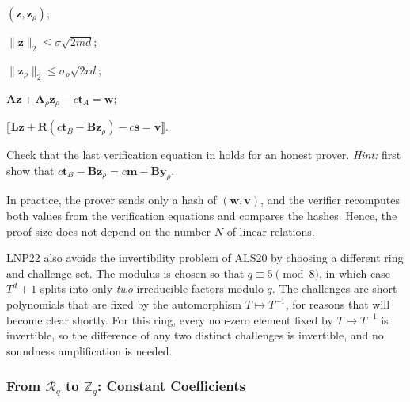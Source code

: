 \documentclass[../../book.tex]{subfiles}
\begin{document}
\begin{algoproto}[H]
\begin{mdframed}[linecolor=black, linewidth=1pt,
                     skipabove=10pt, skipbelow=10pt,
                     innerleftmargin=5pt, innerrightmargin=5pt]
\begin{minipage}[t]{0.5\linewidth}
\begin{algoen}
                \item {} $(\mathbf{z}, \mathbf{z}_{\rho})$;
                \item {} $\|\mathbf{z}\|_2 \leq \sigma\sqrt{2md}$;
                \item {} $\|\mathbf{z}_{\rho}\|_2 \leq \sigma_{\rho}\sqrt{2rd}$;
                \item {} $\mathbf{A}\mathbf{z} + \mathbf{A}_{\rho}\mathbf{z}_{\rho} - c\mathbf{t}_A = \mathbf{w}$;
                \item {} $\llbracket \mathbf{L}\mathbf{z} + \mathbf{R}(c\mathbf{t}_B - \mathbf{B}\mathbf{z}_{\rho}) - c\mathbf{s} = \mathbf{v} \rrbracket$.
            \end{algoen}
        \end{minipage}
    \end{mdframed}
    \caption{Opening proof for the ABDLOP commitment $\mathsf{T}$ together with $N$ public $\mathcal{R}_q$-linear relations $\mathbf{L}\mathbf{x} + \mathbf{R}\mathbf{m} = \mathbf{s}$ (following \cite[Fig.~4]{C:LyuNguPla22}).}
    \label{fig:lnp22-linear}
\end{algoproto}

\begin{exercise}
    Check that the last verification equation in  holds for an honest prover.
    \textit{Hint:} first show that $c\mathbf{t}_B - \mathbf{B}\mathbf{z}_{\rho} = c\mathbf{m} - \mathbf{B}\mathbf{y}_{\rho}$.
\end{exercise}

In practice, the prover sends only a hash of $(\mathbf{w}, \mathbf{v})$, and the verifier recomputes both values from the verification equations and compares the hashes.
Hence, the proof size does not depend on the number $N$ of linear relations.

LNP22 also avoids the invertibility problem of ALS20 by choosing a different ring and challenge set.
The modulus is chosen so that $q \equiv 5 \pmod 8$, in which case $T^d+1$ splits into only \emph{two} irreducible factors modulo $q$.
The challenges are short polynomials that are fixed by the automorphism $T \mapsto T^{-1}$, for reasons that will become clear shortly.
For this ring, every non-zero element fixed by $T \mapsto T^{-1}$ is invertible, so the difference of any two distinct challenges is invertible, and no soundness amplification is needed.

\subsubsection{From $\mathcal{R}_q$ to $\mathbb{Z}_q$: Constant Coefficients}
\end{document}
